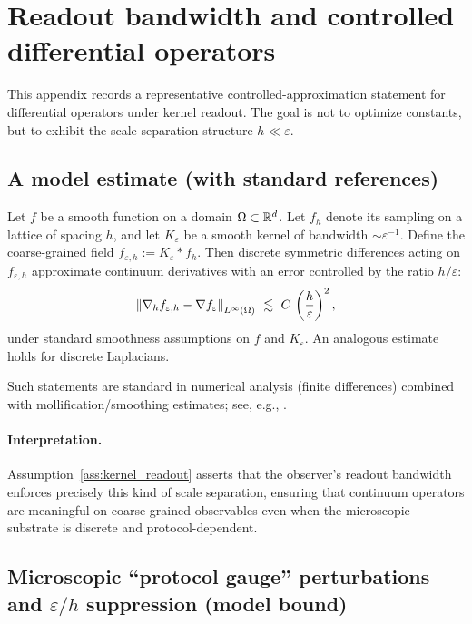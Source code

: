\section{Readout bandwidth and controlled differential operators}
\label{app:readout_error_bounds}

This appendix records a representative controlled-approximation statement for differential operators under kernel readout.
The goal is not to optimize constants, but to exhibit the scale separation structure $h\ll\varepsilon$.

\subsection{A model estimate (with standard references)}
\label{app:model_estimate}

Let $f$ be a smooth function on a domain $\Omega\subset\mathbb{R}^d$.
Let $f_h$ denote its sampling on a lattice of spacing $h$, and let $K_\varepsilon$ be a smooth kernel of bandwidth $\sim\varepsilon^{-1}$.
Define the coarse-grained field $f_{\varepsilon,h}:=K_\varepsilon * f_h$.
Then discrete symmetric differences acting on $f_{\varepsilon,h}$ approximate continuum derivatives with an error controlled by the ratio $h/\varepsilon$:
\begin{equation}
  \left\lVert \nabla_h f_{\varepsilon,h} - \nabla f_\varepsilon\right\rVert_{L^\infty(\Omega)}
  \ \lesssim\ C\,\left(\frac{h}{\varepsilon}\right)^2,
\end{equation}
under standard smoothness assumptions on $f$ and $K_\varepsilon$.
An analogous estimate holds for discrete Laplacians.
\par
\noindent Such statements are standard in numerical analysis (finite differences) combined with mollification/smoothing estimates; see, e.g., \cite{LeVeque2007,Evans2010}.

\paragraph{Interpretation.}
Assumption~\ref{ass:kernel_readout} asserts that the observer's readout bandwidth enforces precisely this kind of scale separation, ensuring that continuum operators are meaningful on coarse-grained observables even when the microscopic substrate is discrete and protocol-dependent.

\subsection{Microscopic ``protocol gauge'' perturbations and $\varepsilon/h$ suppression (model bound)}
\label{app:protocol_gauge_suppression}

